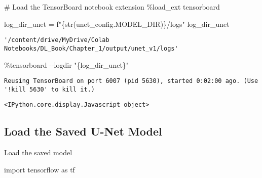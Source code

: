 \documentclass[
  letterpaper,
  DIV=11,
  numbers=noendperiod]{scrreprt}
\newenvironment{Shaded}{\begin{snugshade}}{\end{snugshade}}
\newcommand{\BuiltInTok}[1]{\textcolor[rgb]{0.00,0.23,0.31}{#1}}
\newcommand{\CommentTok}[1]{\textcolor[rgb]{0.37,0.37,0.37}{#1}}
\newcommand{\ImportTok}[1]{\textcolor[rgb]{0.00,0.46,0.62}{#1}}
\newcommand{\NormalTok}[1]{\textcolor[rgb]{0.00,0.23,0.31}{#1}}
\newcommand{\OperatorTok}[1]{\textcolor[rgb]{0.37,0.37,0.37}{#1}}
\newcommand{\SpecialCharTok}[1]{\textcolor[rgb]{0.37,0.37,0.37}{#1}}
\newcommand{\SpecialStringTok}[1]{\textcolor[rgb]{0.13,0.47,0.30}{#1}}
\newcommand{\StringTok}[1]{\textcolor[rgb]{0.13,0.47,0.30}{#1}}
\begin{document}
\begin{Shaded}
\begin{Highlighting}[]
\CommentTok{\# Load the TensorBoard notebook extension}
\OperatorTok{\%}\NormalTok{load\_ext tensorboard}
\end{Highlighting}
\end{Shaded}

\begin{Shaded}
\begin{Highlighting}[]
\NormalTok{log\_dir\_unet }\OperatorTok{=} \SpecialStringTok{f"}\SpecialCharTok{\{}\BuiltInTok{str}\NormalTok{(unet\_config.MODEL\_DIR)}\SpecialCharTok{\}}\SpecialStringTok{/logs"}
\NormalTok{log\_dir\_unet}
\end{Highlighting}
\end{Shaded}

\begin{verbatim}
'/content/drive/MyDrive/Colab Notebooks/DL_Book/Chapter_1/output/unet_v1/logs'
\end{verbatim}

\begin{Shaded}
\begin{Highlighting}[]
\OperatorTok{\%}\NormalTok{tensorboard }\OperatorTok{{-}{-}}\NormalTok{logdir }\StringTok{"}\SpecialCharTok{\{log\_dir\_unet\}}\StringTok{"}
\end{Highlighting}
\end{Shaded}

\begin{verbatim}
Reusing TensorBoard on port 6007 (pid 5630), started 0:02:00 ago. (Use '!kill 5630' to kill it.)
\end{verbatim}

\begin{verbatim}
<IPython.core.display.Javascript object>
\end{verbatim}

\subsection{Load the Saved U-Net
Model}\label{load-the-saved-u-net-model}

Load the saved model

\begin{Shaded}
\begin{Highlighting}[]
\ImportTok{import}\NormalTok{ tensorflow }\ImportTok{as}\NormalTok{ tf}
\end{Highlighting}
\end{Shaded}
\end{document}
